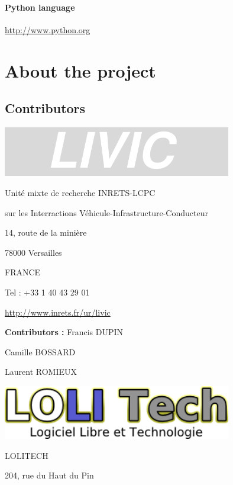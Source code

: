 \documentclass[a4paper,12pt]{book}
\begin{document}
\paragraph{Python language\newline}
\href{http://www.python.org/}{http://www.python.org}

\clearpage\section{About the project}
\subsection{Contributors }
 \begin{center}
   \includegraphics[width=10cm]{Pictures/1000020100000258000000832C6FFAB4.png}
\end{center}

Unit\'e mixte de recherche INRETS{}-LCPC

sur les Interractions V\'ehicule{}-Infrastructure{}-Conducteur

14, route de la mini\`ere

78000 Versailles

FRANCE

Tel : +33 1 40 43 29 01

\href{http://www.inrets.fr/ur/livic}{http://www.inrets.fr/ur/livic}

\textbf{Contributors :} Francis DUPIN

   Camille BOSSARD

   Laurent ROMIEUX


\bigskip

 \begin{center}
   \includegraphics[width=10cm]{Pictures/100002010000013A0000004A96B0C1FF.png}
\end{center}

LOLITECH

204, rue du Haut du Pin
\end{document}
